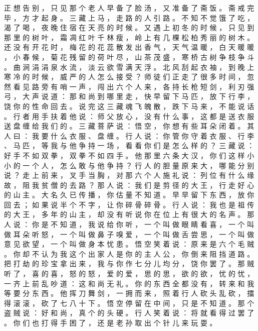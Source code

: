 {正 想 告 别 ， 只 见 那 个 老 人 早 备 了 脸 汤 ， 又 准 备 了 斋 饭 。
斋 戒 完 毕 ， 方 才 起 身 。
三 藏 上 马 ， 走 路 的 人 引 路 。
不 知 不 觉 饿 了 吃 ， 渴 了 喝 ， 夜 晚 住 宿 在 天 亮 的 时 候 。
又 遇 上 初 冬 的 时 候 ， 只 见 到 那 里 的 树 叶 ， 霜 凋 红 叶 千 林 瘦 ， 岭 上 有 几 棵 松 柏 秀 丽 的 树 木 。
还 没 有 开 花 时 ， 梅 花 的 花 蕊 散 发 出 香 气 ， 天 气 温 暖 ， 白 天 暖 暖 ， 小 春 候 ， 菊 花 残 留 的 荷 叶 尽 ， 山 茶 茂 盛 ， 寒 桥 古 树 争 枝 争 斗 。
曲 涧 涓 涓 泉 水 流 ， 淡 云 欲 雪 满 天 浮 。
北 风 刮 起 衣 袖 ， 到 晚 上 寒 冷 的 时 候 ， 威 严 的 人 怎 么 接 受 ？ 师 徒 们 正 走 了 很 多 时 间 ， 忽 然 看 见 路 旁 有 哨 一 声 ， 闯 出 六 个 人 来 ， 各 持 长 枪 短 剑 ， 利 刃 强 弓 ， 大 声 说 道 ： 那 和 尚 到 哪 里 走 ， 快 早 留 下 马 匹 ， 放 下 行 李 ， 饶 你 的 性 命 回 去 。
说 完 这 三 藏 魂 飞 魄 散 ， 跌 下 马 来 ， 不 能 说 话 。
行 者 用 手 扶 着 他 说 ： 师 父 放 心 ， 没 有 什 么 事 ， 这 都 是 送 衣 服 送 盘 缠 给 我 们 的 。
三 藏 菩 萨 说 ： 悟 空 ， 你 想 有 些 耳 朵 闭 着 。
其 人 曰 ： 我 要 什 么 衣 服 、 盘 缠 。
行 人 说 ： 你 管 你 守 着 衣 服 、 行 李 、 马 匹 ， 等 我 与 他 争 持 一 场 ， 看 看 你 们 是 怎 么 样 的 ？
三 藏 说 ： 好 手 不 如 双 拳 ， 双 拳 不 如 四 手 。
他 那 里 六 条 大 汉 ， 你 们 这 样 小 小 的 一 个 人 ， 怎 么 敢 与 他 争 持 ？ 行 人 的 胆 量 原 来 大 ， 哪 能 分 别 说 ？ 走 上 前 来 ， 叉 手 当 胸 ， 对 那 六 个 人 施 礼 说 ： 列 位 有 什 么 缘 故 ， 阻 我 贫 僧 的 去 路 ？ 那 人 说 ： 我 们 是 剪 径 的 大 王 ， 行 走 好 心 的 山 主 。
大 名 久 已 传 播 ， 你 估 量 不 知 道 。
早 早 留 下 东 西 ， 放 你 回 去 ； 如 果 说 半 个 不 字 ， 让 你 碎 骨 碎 骨 。
行 人 说 ： 我 也 是 祖 传 的 大 王 ， 多 年 的 山 主 ， 却 没 有 听 说 你 在 位 上 有 很 大 的 名 声 。
那 人 说 ： 你 是 不 知 道 ， 我 说 给 你 听 ， 一 个 叫 做 眼 睛 看 喜 ， 一 个 叫 做 耳 朵 听 怒 ， 一 个 叫 做 鼻 子 嗅 爱 ， 一 个 叫 做 舌 尝 思 ， 一 个 叫 做 意 见 欲 望 ， 一 个 叫 做 身 本 忧 患 。
悟 空 笑 着 说 ： 原 来 是 六 个 毛 贼 。
你 却 不 认 为 我 这 个 出 家 人 是 你 的 主 人 公 ， 你 倒 来 阻 挡 道 路 。
把 打 劫 的 珍 宝 拿 出 来 ， 我 与 你 作 七 分 儿 均 分 ， 饶 你 罢 了 。
那 贼 听 了 ， 喜 的 喜 ， 怒 的 怒 ， 爱 的 爱 ， 思 的 思 ， 欲 的 欲 ， 忧 的 忧 ， 一 齐 上 前 乱 吵 道 ： 这 和 尚 无 礼 。
你 的 东 西 全 都 没 有 ， 转 来 和 我 等 要 分 东 西 。
他 挥 刀 舞 剑 ， 一 拥 而 来 ， 照 着 行 人 砍 头 乱 砍 ， 擂 得 滚 滚 ， 砍 了 七 八 十 下 。
悟 空 停 留 在 中 间 ， 只 是 不 知 道 。
那 个 盗 贼 说 ： 好 和 尚 ， 真 个 的 头 硬 。
行 人 笑 着 说 ： 将 就 看 得 过 罢 了 。
你 们 也 打 得 手 困 了 ， 还 是 老 孙 取 出 个 针 儿 来 玩 耍 。
}
